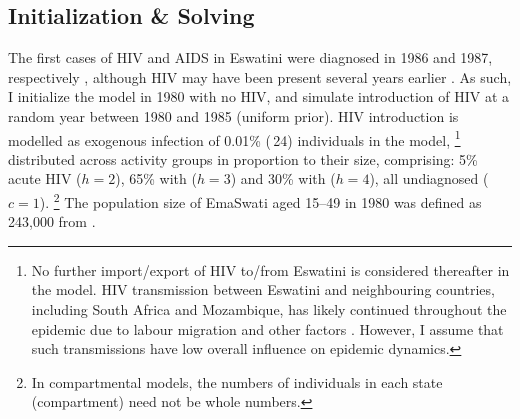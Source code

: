 \subsection{Initialization \& Solving}\label{model.init}
The first cases of HIV and AIDS in Eswatini
were diagnosed in 1986 and 1987, respectively \cite{Whiteside2007},
although HIV may have been present several years earlier \cite{Iliffe2006}.
As such, I initialize the model in 1980 with no HIV,
and simulate introduction of HIV at a random year between 1980 and 1985 (uniform prior).
HIV introduction is modelled as
exogenous infection of 0.01\% (\ttilde\,24) individuals in the model,%
\footnote{No further import/export of HIV to/from Eswatini is considered thereafter in the model.
  HIV transmission between Eswatini and neighbouring countries,
  including South Africa and Mozambique,
  has likely continued throughout the epidemic
  due to labour migration and other factors \cite{Iliffe2006}.
  However, I assume that such transmissions have low overall influence on epidemic dynamics.}
distributed across activity groups in proportion to their size, comprising:
5\% acute HIV ($h=2$), 65\% with  ($h=3$) and 30\% with  ($h=4$),
all undiagnosed ($c=1$).%
\footnote{In compartmental models, the numbers of individuals in each state (compartment)
  need not be whole numbers.}
The population size of EmaSwati aged 15--49 in 1980
was defined as 243,000 from \cite{WorldBank}.
